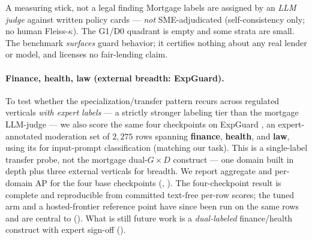 \begin{takeaway}{A measuring stick, not a legal finding}
Mortgage labels are assigned by an \emph{LLM judge} against written policy cards --- \emph{not}
SME-adjudicated (self-consistency only; no human Fleiss-$\kappa$). The G1/D0 quadrant is empty and some
strata are small. The benchmark \emph{surfaces} guard behavior; it certifies nothing about any real
lender or model, and licenses no fair-lending claim.
\end{takeaway}

\paragraph{Finance, health, law (external breadth: ExpGuard).} To test whether the
specialization/transfer pattern recurs across regulated verticals \emph{with expert labels} --- a
strictly stronger labeling tier than the mortgage LLM-judge --- we also score the same four checkpoints
on ExpGuard \citep{expguard2026}, an expert-annotated moderation set of $2{,}275$ rows spanning
\textbf{finance}, \textbf{health}, and \textbf{law}, using its  for input-prompt
classification (matching our task). This is a single-label transfer probe, not the mortgage dual-$G\times D$
construct --- one domain built in depth plus three external verticals for breadth. We report aggregate
and per-domain AP for the four base checkpoints (, ). The
four-checkpoint result is complete and reproducible from committed text-free per-row scores; the tuned
arm and a hosted-frontier reference point have since been run on the same rows and are central to
 (). What is still future work is a \emph{dual-labeled}
finance/health construct with expert sign-off ().
